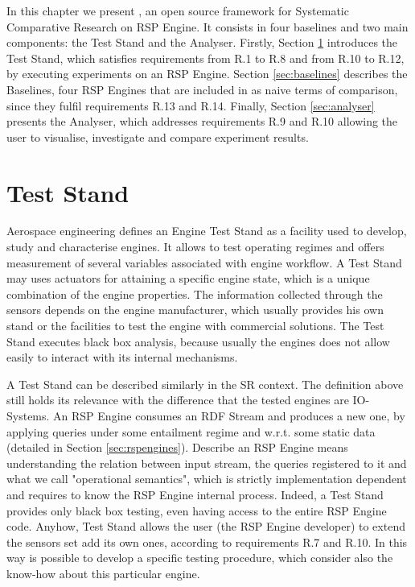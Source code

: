 In this chapter we present  \namens,  an open source framework for Systematic Comparative Research on RSP Engine.
It consists in four baselines and two main components: the Test Stand and the Analyser. Firstly, Section \ref{sec:teststand} introduces the Test Stand, which satisfies requirements from R.1 to R.8 and from R.10 to R.12, by executing experiments on an RSP Engine. Section \ref{sec:baselines} describes the Baselines, four RSP Engines that are included in \name as naive terms of comparison, since they fulfil requirements R.13 and R.14. Finally, Section \ref{sec:analyser} presents the Analyser, which addresses requirements R.9 and R.10  allowing the user to visualise, investigate and compare experiment results. %

\section{Test Stand}\label{sec:teststand}

Aerospace engineering defines an Engine Test Stand as a facility used to develop, study and characterise engines. It allows to test operating regimes and offers measurement of several variables associated with engine workflow. A Test Stand may uses actuators for attaining a specific engine state, which is a unique combination of the engine properties. The information collected through the sensors depends on the engine manufacturer, which usually provides his own stand or the facilities to test the engine with commercial solutions. The Test Stand executes black box analysis, because usually the engines does not allow easily to interact with its internal mechanisms.

A Test Stand can be described similarly in the SR context. The definition above still holds its relevance with the difference that the tested engines are IO-Systems. An RSP Engine consumes an RDF Stream and  produces a new one, by applying queries under some entailment regime and w.r.t. some static data (detailed in Section \ref{sec:rspengines}). Describe an RSP Engine means understanding the relation between input stream, the queries registered to it and what we call "operational semantics", which is strictly implementation dependent and requires to know the RSP Engine internal process. Indeed, a Test Stand provides only black box testing, even having access to the entire RSP Engine code. Anyhow, \name Test Stand allows the user (the RSP Engine developer) to extend the sensors set add its own ones, according to requirements R.7 and R.10. In this way is possible to develop a specific testing procedure, which consider also the know-how about this particular engine.

